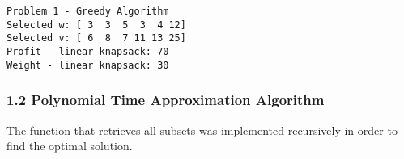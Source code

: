 \documentclass[11pt]{article}
\begin{document}
    \begin{Verbatim}[commandchars=\\\{\}]
Problem 1 - Greedy Algorithm 
Selected w: [ 3  3  5  3  4 12]
Selected v: [ 6  8  7 11 13 25]
Profit - linear knapsack: 70
Weight - linear knapsack: 30

    \end{Verbatim}

    \subsubsection{1.2 Polynomial Time Approximation
Algorithm}\label{polynomial-time-approximation-algorithm}

The function that retrieves all subsets was implemented recursively in
order to find the optimal solution.
\end{document}
